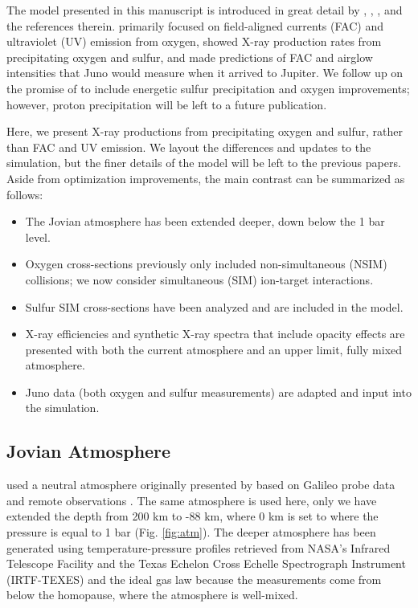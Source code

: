 \documentclass[draft]{agujournal2018}
\begin{document}
The model presented in this manuscript is introduced in great detail by \citet{houston2018}, \citet{ozak2010}, \citet{ozak2013}, and the references therein.
\citet{houston2018} primarily focused on field-aligned currents (FAC) and ultraviolet (UV) emission from oxygen, \citet{ozak2010} showed X-ray production rates from precipitating oxygen and sulfur, and \citet{ozak2013} made predictions of FAC and airglow intensities that Juno would measure when it arrived to Jupiter.
We follow up on the promise of \citet{houston2018} to include energetic sulfur precipitation and oxygen improvements; however, proton precipitation will be left to a future publication. 

Here, we present X-ray productions from precipitating oxygen and sulfur, rather than FAC and UV emission.
We layout the differences and updates to the simulation, but the finer details of the model will be left to the previous papers.
Aside from optimization improvements, the main contrast can be summarized as follows:
\begin{itemize}
\item The Jovian atmosphere has been extended deeper, down below the 1 bar level.
\item Oxygen cross-sections previously only included non-simultaneous (NSIM) collisions; we now consider simultaneous (SIM) ion-target interactions.
\item Sulfur SIM cross-sections have been analyzed and are included in the model.
\item X-ray efficiencies and synthetic X-ray spectra that include opacity effects are presented with both the current atmosphere and an upper limit, fully mixed atmosphere.
\item Juno data (both oxygen and sulfur measurements) are adapted and input into the simulation.
\end{itemize}

\subsection{Jovian Atmosphere}
\label{sec:atm}

\citet{houston2018} used a neutral atmosphere originally presented by \citet{maurellis2001} based on Galileo probe data \citep{seiff1996,seiff1997} and remote observations \citep{sada1998}.
The same atmosphere is used here, only we have extended the depth from 200 km to -88 km, where 0 km is set to where the pressure is equal to 1 bar (Fig. \ref{fig:atm}).
The deeper atmosphere has been generated using temperature-pressure profiles retrieved from NASA's Infrared Telescope Facility and the Texas Echelon Cross Echelle Spectrograph Instrument (IRTF-TEXES) \citep{sinclair2018} and the ideal gas law because the measurements come from below the homopause, where the atmosphere is well-mixed.
\end{document}
